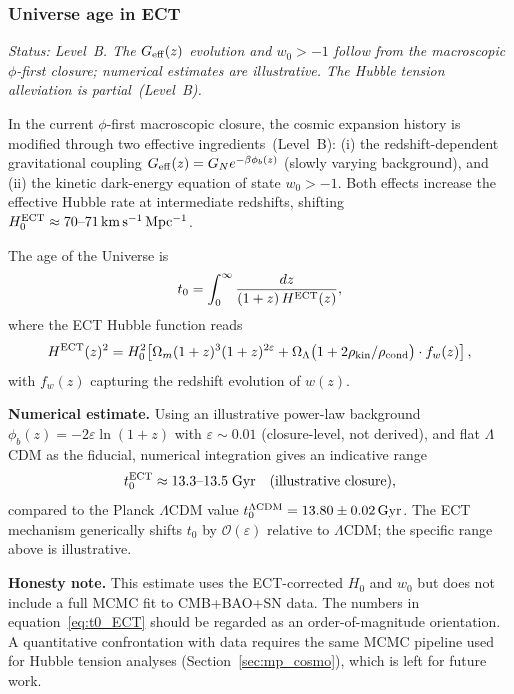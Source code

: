 \documentclass[11pt,a4paper]{article}
\numberwithin{equation}{section}
\begin{document}
\subsubsection*{Universe age in ECT}
\label{sec:universe_age}

\textit{Status: Level~B. The $G_{\rm eff}(z)$ evolution
and $w_0 > -1$ follow from the macroscopic $\phi$-first closure;
numerical estimates are illustrative. The Hubble tension
alleviation is partial~(Level~B).}

In the current $\phi$-first macroscopic closure, the cosmic expansion
history is modified through two effective ingredients~(Level~B):
(i) the redshift-dependent gravitational coupling
$G_{\rm eff}(z) = G_N e^{-\beta\phi_b(z)}$ (slowly varying background), and
(ii) the kinetic dark-energy equation of state $w_0 > -1$.
Both effects increase the effective Hubble rate at intermediate redshifts, 
shifting $H_0^{\rm ECT} \approx 70\text{--}71\,\mathrm{km\,s^{-1}\,Mpc^{-1}}$.

The age of the Universe is
\begin{equation}
  t_0 = \int_0^\infty \frac{dz}{(1+z)\,H^{\rm ECT}(z)},
  \label{eq:age_integral}
\end{equation}
where the ECT Hubble function reads
\begin{equation}
  H^{\rm ECT}(z)^2 = H_0^2\!\left[
    \Omega_m(1+z)^3 (1+z)^{2\varepsilon}
    + \Omega_\Lambda \bigl(1 + 2\rho_{\rm kin}/\rho_{\rm cond}\bigr)
    \cdot f_w(z)
  \right],
\end{equation}
with $f_w(z)$ capturing the redshift evolution of $w(z)$.

\textbf{Numerical estimate.}
Using an illustrative power-law background $\phi_b(z)=-2\varepsilon\ln(1+z)$
with $\varepsilon\sim 0.01$ (closure-level, not derived), and flat
$\Lambda$CDM as the fiducial, numerical integration gives an indicative range
\begin{equation}
  t_0^{\rm ECT} \approx 13.3\text{--}13.5\;\mathrm{Gyr}
  \quad\text{(illustrative closure)},
  \label{eq:t0_ECT}
\end{equation}
compared to the Planck $\Lambda$CDM value $t_0^{\Lambda{\rm CDM}} = 13.80 \pm 0.02\,\mathrm{Gyr}$.
The ECT mechanism generically shifts $t_0$ by $\mathcal{O}(\varepsilon)$ relative
to $\Lambda$CDM; the specific range above is illustrative.

\textbf{Honesty note.}
This estimate uses the ECT-corrected $H_0$ and $w_0$ but does not
include a full MCMC fit to CMB+BAO+SN data.  The numbers in
equation~\eqref{eq:t0_ECT} should be regarded as an order-of-magnitude
orientation.  A quantitative confrontation with data requires the same
MCMC pipeline used for Hubble tension analyses (Section~\ref{sec:mp_cosmo}),
which is left for future work.
\end{document}
